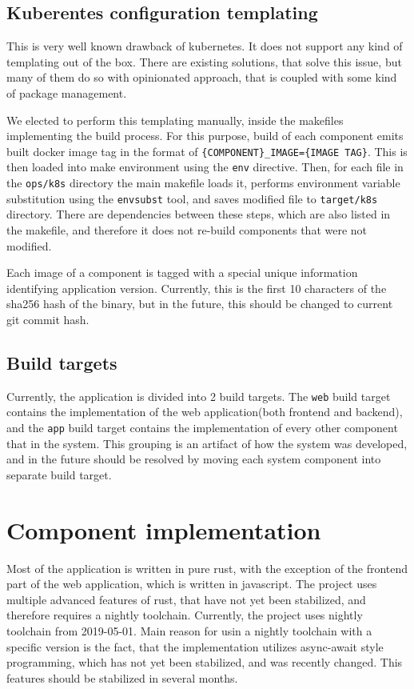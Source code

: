 \subsection{Kuberentes configuration templating}
This is very well known drawback of kubernetes. It does not support any kind of templating out of the box.
There are existing solutions, that solve this issue, but many of them do so with opinionated approach, that is coupled
with some kind of package management.

We elected to perform this templating manually, inside the makefiles implementing the build process. For this purpose,
build of each component emits built docker image tag in the format of \verb|{COMPONENT}_IMAGE={IMAGE TAG}|.
This is then loaded into make environment using the \verb|env| directive. Then, for each file in the \verb|ops/k8s| directory
the main makefile loads it, performs environment variable substitution using the \verb|envsubst| tool, and saves modified
file to \verb|target/k8s| directory. There are dependencies between these steps, which are also listed in the makefile, and
therefore it does not re-build components that were not modified.

Each image of a component is tagged with a special unique information identifying application version. Currently,
this is the first 10 characters of the sha256 hash of the binary, but in the future, this should be changed to current
git commit hash.

\subsection{Build targets}
Currently, the application is divided into 2 build targets. The \verb|web| build target contains the implementation
of the web application(both frontend and backend), and the \verb|app| build target contains the implementation
of every other component that in the system. This grouping is an artifact of how the system was developed, and in the
future should be resolved by moving each system component into separate build target.

\section{Component implementation}
Most of the application is written in pure rust, with the exception of the frontend part of the web application, which
is written in javascript. The project uses multiple advanced features of rust, that have not yet been stabilized, and
therefore requires a nightly toolchain. Currently, the project uses nightly toolchain from 2019-05-01. Main
reason for usin a nightly toolchain with a specific version is the fact, that the implementation utilizes
async-await style programming, which has not yet been stabilized, and was recently changed. This features
should be stabilized in several months.

